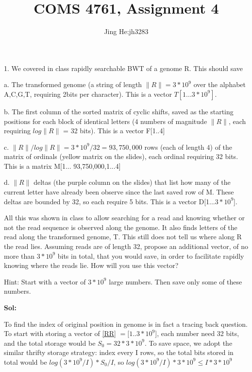 \documentclass[a4paper,11pt]{article}
\title{COMS 4761, Assignment 4}
\author{Jing He:jh3283}
\begin{document}
\maketitle


1. We covered in class rapidly searchable BWT of a genome R. This should save

a. The transformed genome (a string of length \label{RR}$\|R\|=3*10^{9}$ over the alphabet A,C,G,T, requiring 2bits per character). This is a vector $T[1...3*10^{9}]$.

b.  The first column of the sorted matrix of cyclic shifts, saved as the starting positions for each block of identical letters (4 numbers of magnitude $\|R\|$, each requiring $log\|R\|$ = 32 bits). This is a vector F[1..4]

c.  $\|R\|/log\|R\|=3*10^{9}/32=93,750,000$ rows (each of length 4) of the matrix of ordinals (yellow matrix on the slides), each ordinal requiring 32 bits. This is a matrix M[1... 93,750,000,1...4]

d.  $\|R\|$ deltas (the purple column on the slides) that list how many of the current letter have already been observe since the last saved row of M. These deltas are bounded by 32, so each require 5 bits. This is a
vector D[1...$3*10^{9}$].

All this was shown in class to allow searching for a read and knowing whether or not the read sequence is observed along the genome. It also finds letters of the read along the transformed genome, T. This still does not tell us where along R the read lies. Assuming reads are of length 32, propose an additional vector, of no more than $3*10^{9}$ bits in total, that you would save, in order to facilitate rapidly knowing where the reads lie.
How will you use this vector?

Hint: Start with a vector of $3*10^{9}$ large numbers. Then save only some of these numbers.

\textbf{Sol:}

To find the index of original position in genome is in fact a tracing back question. To start with storing a vector of \ref{RR} $=[1..3*10^{9}$], each number need 32 bits, and the total storage would be $S_{0} = 32 * 3*10^{9}$. To save space, we adopt the similar thrifty storage strategy: index every I rows, so the total bits stored in total would be $log(3*10^{9}/I) * S_{0} / I$, so $log(3*10^{9}/I) * 3*10^{9} \leq I*3*10^{9}$ \\
\end{document}
